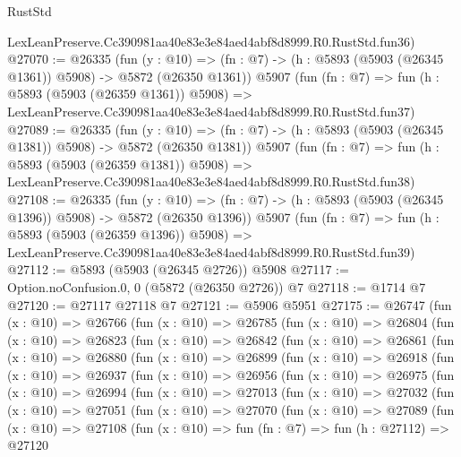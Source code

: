 \begin{lexlean}{RustStd}
\begin{coremodule}
    LexLeanPreserve.Cc390981aa40e83e3e84aed4abf8d8999.R0.RustStd.fun36)
@27070 := @26335
    (fun (y : @10) => (fn : @7) -> (h : @5893 (@5903 (@26345 @1361)) @5908) -> @5872 (@26350 @1361))
    @5907
    (fun (fn : @7) =>
    fun (h : @5893 (@5903 (@26359 @1361)) @5908) =>
    LexLeanPreserve.Cc390981aa40e83e3e84aed4abf8d8999.R0.RustStd.fun37)
@27089 := @26335
    (fun (y : @10) => (fn : @7) -> (h : @5893 (@5903 (@26345 @1381)) @5908) -> @5872 (@26350 @1381))
    @5907
    (fun (fn : @7) =>
    fun (h : @5893 (@5903 (@26359 @1381)) @5908) =>
    LexLeanPreserve.Cc390981aa40e83e3e84aed4abf8d8999.R0.RustStd.fun38)
@27108 := @26335
    (fun (y : @10) => (fn : @7) -> (h : @5893 (@5903 (@26345 @1396)) @5908) -> @5872 (@26350 @1396))
    @5907
    (fun (fn : @7) =>
    fun (h : @5893 (@5903 (@26359 @1396)) @5908) =>
    LexLeanPreserve.Cc390981aa40e83e3e84aed4abf8d8999.R0.RustStd.fun39)
@27112 := @5893 (@5903 (@26345 @2726)) @5908
@27117 := Option.noConfusion.{0, 0} (@5872 (@26350 @2726)) @7
@27118 := @1714 @7
@27120 := @27117 @27118 @7
@27121 := @5906 @5951
@27175 := @26747
    (fun (x : @10) =>
    @26766
      (fun (x : @10) =>
      @26785
        (fun (x : @10) =>
        @26804
          (fun (x : @10) =>
          @26823
            (fun (x : @10) =>
            @26842
              (fun (x : @10) =>
              @26861
                (fun (x : @10) =>
                @26880
                  (fun (x : @10) =>
                  @26899
                    (fun (x : @10) =>
                    @26918
                      (fun (x : @10) =>
                      @26937
                        (fun (x : @10) =>
                        @26956
                          (fun (x : @10) =>
                          @26975
                            (fun (x : @10) =>
                            @26994
                              (fun (x : @10) =>
                              @27013
                                (fun (x : @10) =>
                                @27032
                                  (fun (x : @10) =>
                                  @27051
                                    (fun (x : @10) =>
                                    @27070
                                      (fun (x : @10) =>
                                      @27089
                                        (fun (x : @10) =>
                                        @27108
                                          (fun (x : @10) =>
                                          fun (fn : @7) =>
                                          fun (h : @27112) =>
                                          @27120

\end{coremodule}
\end{lexlean}
